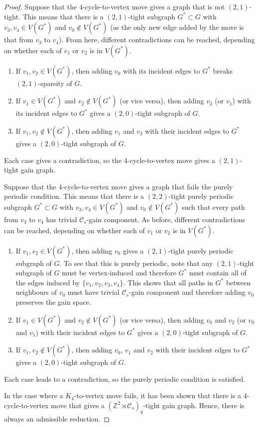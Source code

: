 \documentclass[reqno,a4paper,10pt]{article}
\theoremstyle{definition}
\theoremstyle{remark}
\numberwithin{equation}{section}
\numberwithin{figure}{section}
\numberwithin{table}{section}
\newcommand{\Z}{\mathbb{Z}}
\begin{document}
\begin{proof}
		Suppose that the $4$-cycle-to-vertex move gives a graph that is not $(2,1)$-tight. This means that there is a $(2,1)$-tight subgraph $G^*\subset G$ with $v_3,v_4\in V(G^*)$ and $v_0\notin V(G^*)$ (as the only new edge added by the move is that from $v_3$ to $v_4$). From here, different contradictions can be reached, depending on whether each of $v_1$ or $v_2$ is in $V(G^*)$.
		\begin{enumerate}
			\item If $v_1,v_2\in V(G^*)$, then adding $v_0$ with its incident edges to $G^*$ breaks $(2,1)$-sparsity of $G$.
			\item If $v_1\in V(G^*)$ and $v_2\notin V(G^*)$ (or vice versa), then adding $v_2$ (or $v_1$) with its incident edges to $G^*$ gives a $(2,0)$-tight subgraph of $G$.
			\item If $v_1,v_2\notin V(G^*)$, then adding $v_1$ and $v_2$ with their incident edges to $G^*$ gives a $(2,0)$-tight subgraph of $G$.
		\end{enumerate}
       		Each case gives a contradiction, so the $4$-cycle-to-vertex move gives a $(2,1)$-tight gain graph.
		
		Suppose that the $4$-cycle-to-vertex move gives a graph that fails the purely periodic condition. This means that there is a $(2,2)$-tight purely periodic subgraph $G^*\subset G$ with $v_3,v_4\in V(G^*)$ and $v_0\notin V(G^*)$ such that every path from $v_3$ to $v_4$ has trivial $\mathcal{C}_s$-gain component. As before, different contradictions can be reached, depending on whether each of $v_1$ or $v_2$ is in $V(G^*)$.
		\begin{enumerate}
			\item If $v_1,v_2\in V(G^*)$, then adding $v_0$ gives a $(2,1)$-tight purely periodic subgraph of $G$. To see that this is purely periodic, note that any $(2,1)$-tight subgraph of $G$ must be vertex-induced and therefore $G^*$ must contain all of the edges induced by $\{v_1,v_2,v_3,v_4\}$. This shows that all paths in $G^*$ between neighbours of $v_0$ must have trivial $\mathcal{C}_s$-gain component and therefore adding $v_0$ preserves the gain space.
			\item If $v_1\in V(G^*)$ and $v_2\notin V(G^*)$ (or vice versa), then adding $v_0$ and $v_2$ (or $v_0$ and $v_1$) with their incident edges to $G^*$ gives a $(2,0)$-tight subgraph of $G$.
			\item If $v_1,v_2\notin V(G^*)$, then adding $v_0$, $v_1$ and $v_2$ with their incident edges to $G^*$ gives a $(2,0)$-tight subgraph of $G$.
		\end{enumerate}
		Each case leads to a contradiction, so the purely periodic condition is satisfied.

	In the case where a $K_4$-to-vertex move fails, it has been shown that there is a $4$-cycle-to-vertex move that gives a $(\Z^2\rtimes\mathcal{C}_s)_q$-tight gain graph. Hence, there is always an admissible reduction.
	\end{proof}
\end{document}
